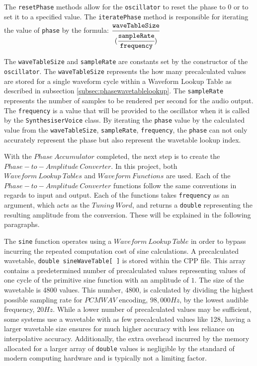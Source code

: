 \documentclass[a4paper,12pt]{report}
\begin{document}
The \texttt{resetPhase} methods allow for the \texttt{oscillator} to reset the phase to $0$ or to set it to a specified value. The \texttt{iteratePhase} method is responsible for iterating the value of \texttt{phase} by the formula: \begin{math}
\cfrac{\texttt{waveTableSize}}{(\cfrac{\texttt{sampleRate}}{\texttt{frequency}})}
\end{math}

The \texttt{waveTableSize} and \texttt{sampleRate} are constants set by the constructor of the \texttt{oscillator}. The \texttt{waveTableSize} represents the how many precalculated values are stored for a single waveform cycle within a Waveform Lookup Table as described in subsection \ref{subsec:phasewavetablelookup}. The \texttt{sampleRate} represents the number of samples to be rendered per second for the audio output. The \texttt{frequency} is a value that will be provided to the oscillator when it is called by the \texttt{SynthesiserVoice} class. By iterating the \texttt{phase} value by the calculated value from the \texttt{waveTableSize}, \texttt{sampleRate}, \texttt{frequency}, the \texttt{phase} can not only accurately represent the phase but also represent the wavetable lookup index.

With the $Phase\ Accumulator$ completed, the next step is to create the $Phase-to-Amplitude\ Converter$. In this project, both $Waveform\ Lookup\ Tables$ and $Waveform\ Functions$ are used. Each of the $Phase-to-Amplitude\ Converter$ functions follow the same conventions in regards to input and output. Each of the functions takes \texttt{frequency} as an argument, which acts as the $Tuning\ Word$, and returns a \texttt{double} representing the resulting amplitude from the conversion. These will be explained in the following paragraphs.

The \texttt{sine} function operates using a $Waveform\ Lookup\ Table$ in order to bypass incurring the repeated computation cost of sine calculations. A precalculated wavetable, \texttt{double sineWaveTable[ ]} is stored within the CPP file. This array contains a predetermined number of precalculated values representing values of one cycle of the primitive sine function with an amplitude of $1$. The size of the wavetable is 4800 values. This number, $4800$, is calculated by dividing the highest possible sampling rate for $PCM WAV$ encoding, $98,000Hz$, by the lowest audible frequency, $20Hz$. While a lower number of precalculated values may be sufficient, some systems use a wavetable with as few precalculated values like 128, having a larger wavetable size ensures for much higher accuracy with less reliance on interpolative accuracy. Additionally, the extra overhead incurred by the memory allocated for a larger array of \texttt{double} values is negligible by the standard of modern computing hardware and is typically not a limiting factor.
\end{document}
